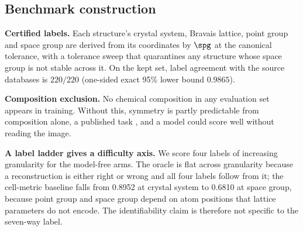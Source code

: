 \subsection{Benchmark construction}
\label{sec:benchmark}

\textbf{Certified labels.} Each structure's crystal system, Bravais lattice, point group and space group
are derived from its coordinates by $\spg$ at the canonical tolerance, with a tolerance sweep that
quarantines any structure whose space group is not stable across it. On the kept set, label agreement with
the source databases is $220/220$ (one-sided exact 95\% lower bound $0.9865$).

\textbf{Composition exclusion.} No chemical composition in any evaluation set appears in training. Without
this, symmetry is partly predictable from composition alone, a published task \citep{cryspnet2003}, and a
model could score well without reading the image.

\textbf{A label ladder gives a difficulty axis.} We score four labels of increasing granularity for the
model-free arms. The oracle is flat across granularity because a
reconstruction is either right or wrong and all four labels follow from it; the cell-metric baseline falls
from 0.8952 at crystal system to 0.6810 at space group, because point group and space group depend on atom
positions that lattice parameters do not encode. The identifiability claim is therefore not specific to the
seven-way label.
